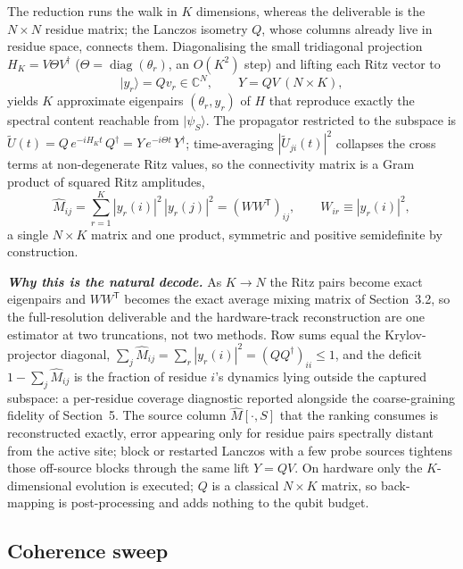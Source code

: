 \documentclass[10pt,a4paper]{article}
\newcommand{\Mhat}{\hat{M}}
\newcommand{\lead}[1]{\textbf{\textit{#1}}}
\begin{document}
The reduction runs the walk in $K$ dimensions, whereas the deliverable is the $N\times N$ residue
matrix; the Lanczos isometry $Q$, whose columns already live in residue space, connects them.
Diagonalising the small tridiagonal projection $H_K = V\Theta V^{\dagger}$
($\Theta = \operatorname{diag}(\theta_r)$, an $O(K^2)$ step) and lifting each Ritz vector to
\begin{equation}
|y_r\rangle = Q v_r \in \mathbb{C}^{N}, \qquad Y = QV \ (N\times K),
\end{equation}
yields $K$ approximate eigenpairs $(\theta_r, y_r)$ of $H$ that reproduce exactly the spectral content
reachable from $|\psi_S\rangle$. The propagator restricted to the subspace is
$\tilde U(t) = Q\,e^{-iH_K t}\,Q^{\dagger} = Y\,e^{-i\Theta t}\,Y^{\dagger}$; time-averaging
$|\tilde U_{ji}(t)|^{2}$ collapses the cross terms at non-degenerate Ritz values, so the connectivity
matrix is a Gram product of squared Ritz amplitudes,
\begin{equation}
\Mhat_{ij} = \sum_{r=1}^{K} |y_r(i)|^{2}\,|y_r(j)|^{2} = (W W^{\mathsf T})_{ij}, \qquad
W_{ir} \equiv |y_r(i)|^{2},
\end{equation}
a single $N\times K$ matrix and one product, symmetric and positive semidefinite by construction.

\lead{Why this is the natural decode.} As $K \to N$ the Ritz pairs become exact eigenpairs and
$W W^{\mathsf T}$ becomes the exact average mixing matrix of Section~3.2, so the full-resolution
deliverable and the hardware-track reconstruction are one estimator at two truncations, not two
methods. Row sums equal the Krylov-projector diagonal,
$\sum_j \Mhat_{ij} = \sum_r |y_r(i)|^{2} = (Q Q^{\dagger})_{ii} \le 1$, and the deficit
$1 - \sum_j \Mhat_{ij}$ is the fraction of residue $i$'s dynamics lying outside the captured
subspace: a per-residue coverage diagnostic reported alongside the coarse-graining fidelity of
Section~5. The source column $\Mhat[\cdot, S]$ that the ranking consumes is reconstructed exactly,
error appearing only for residue pairs spectrally distant from the active site; block or restarted
Lanczos with a few probe sources tightens those off-source blocks through the same lift $Y = QV$. On
hardware only the $K$-dimensional evolution is executed; $Q$ is a classical $N\times K$ matrix, so
back-mapping is post-processing and adds nothing to the qubit budget.

\subsection{Coherence sweep}
\end{document}
